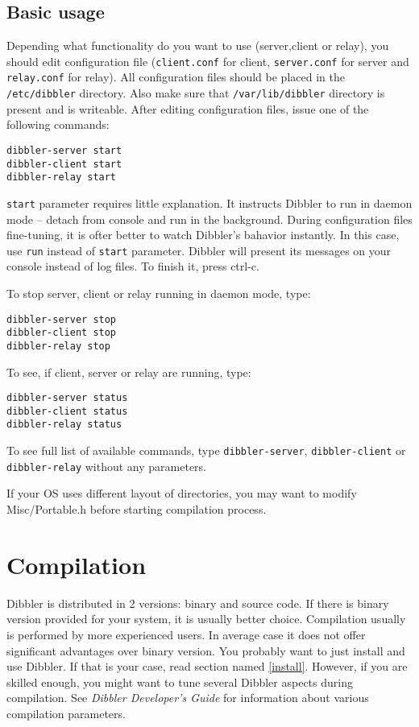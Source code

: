 \subsection{Basic usage}
Depending what functionality do you want to use (server,client or relay),
you should edit configuration file (\verb+client.conf+ for client, \verb+server.conf+
for server and \verb+relay.conf+ for relay). All configuration files should
be placed in the \verb+/etc/dibbler+ directory. Also make sure that
\verb+/var/lib/dibbler+ directory is present and is writeable. After
editing configuration files, issue one of the following commands:

\begin{lstlisting}
dibbler-server start
dibbler-client start
dibbler-relay start
\end{lstlisting}

\verb+start+ parameter requires little explanation. It
instructs Dibbler to run in daemon mode -- detach from console and run
in the background. During configuration files fine-tuning, it is ofter better
to watch Dibbler's bahavior instantly. In this case, use \verb+run+
instead of \verb+start+ parameter. Dibbler will present its messages on
your console instead of log files. To finish it, press ctrl-c.

To stop server, client or relay running in daemon mode, type:
\begin{lstlisting}
dibbler-server stop
dibbler-client stop
dibbler-relay stop
\end{lstlisting}

To see, if client, server or relay are running, type:

\begin{lstlisting}
dibbler-server status
dibbler-client status
dibbler-relay status
\end{lstlisting}

To see full list of available commands, type \verb+dibbler-server+,
\verb+dibbler-client+ or \verb+dibbler-relay+ without any parameters.

If your OS uses different layout of directories, you may want to
modify Misc/Portable.h before starting compilation process.

\newpage
\section{Compilation}
\label{compile}
Dibbler is distributed in 2 versions: binary and source code. If there
is binary version provided for your system,  it is usually better
choice.  Compilation usually is performed by more experienced users.
In average case it does not offer significant advantages over binary version.
You probably want to just install and use Dibbler. If that is your case, read section
named \ref{install}. However, if you are skilled enough, you might
want to tune several Dibbler aspects during compilation. See \emph{
Dibbler Developer's Guide} for information about various compilation
parameters.

